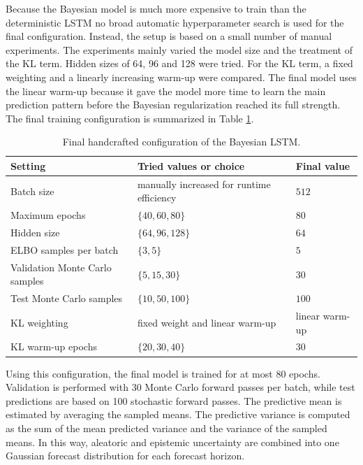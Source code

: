 \documentclass[Master,english,IEEE]{twbook}
\begin{document}
Because the Bayesian model is much more expensive to train than the deterministic LSTM no broad automatic hyperparameter search is used for the final configuration. Instead, the setup is based on a small number of manual experiments. The experiments mainly varied the model size and the treatment of the KL term. Hidden sizes of 64, 96 and 128 were tried. For the KL term, a fixed weighting and a linearly increasing warm-up were compared. The final model uses the linear warm-up because it gave the model more time to learn the main prediction pattern before the Bayesian regularization reached its full strength. The final training configuration is summarized in Table \ref{tabBayesianLstmHyperparameterSearch}.

\begin{table}[!htbp]
\centering
\caption{Final handcrafted configuration of the Bayesian LSTM.}
\label{tabBayesianLstmHyperparameterSearch}
\begin{tabular}{lll}
\hline
Setting & Tried values or choice & Final value \\
\hline
Batch size & manually increased for runtime efficiency & $512$ \\
Maximum epochs & $\{40, 60, 80\}$ & $80$ \\
Hidden size & $\{64, 96, 128\}$ & $64$ \\
ELBO samples per batch & $\{3, 5\}$ & $5$ \\
Validation Monte Carlo samples & $\{5, 15, 30\}$ & $30$ \\
Test Monte Carlo samples & $\{10, 50, 100\}$ & $100$ \\
KL weighting & fixed weight and linear warm-up & linear warm-up \\
KL warm-up epochs & $\{20, 30, 40\}$ & $30$ \\
\hline
\end{tabular}
\end{table}

\FloatBarrier

Using this configuration, the final model is trained for at most 80 epochs. Validation is performed with 30 Monte Carlo forward passes per batch, while test predictions are based on 100 stochastic forward passes. The predictive mean is estimated by averaging the sampled means. The predictive variance is computed as the sum of the mean predicted variance and the variance of the sampled means. In this way, aleatoric and epistemic uncertainty are combined into one Gaussian forecast distribution for each forecast horizon.
\end{document}
